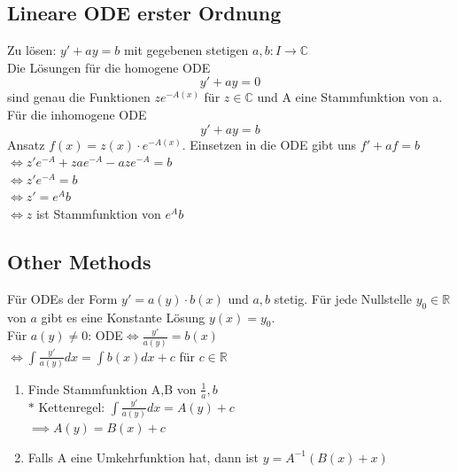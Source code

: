 \subsection{Lineare ODE erster Ordnung}
  Zu lösen: $y'+ay=b$ mit gegebenen stetigen $a,b: I \rightarrow\mathbb C$\\
   Die Lösungen für die homogene ODE $$y'+ay=0$$ sind genau die
  Funktionen $ze^{-A(x)}$ für $z\in\mathbb C$ und A eine Stammfunktion von a.\\
  Für die inhomogene ODE $$y'+ay=b$$ Ansatz $f(x)=z(x)\cdot e^{-A(x)}$.
  Einsetzen in die ODE gibt uns $f'+af=b$\\
  \indent $\iff z'e^{-A}+zae^{-A}-aze^{-A}=b$\\
  \indent $\iff z'e^{-A}=b$\\
  \indent $\iff z'= e^{A}b$\\
  \indent $\iff z$ ist Stammfunktion von $e^{A}b$
\subsection{Other Methods}
  Für ODEs der Form $y'=a(y)\cdot b(x)$ und $a,b$ stetig.
  Für jede Nullstelle $y_0\in\mathbb R$ von $a$ gibt es eine Konstante Lösung
  $y(x)=y_0$.\\
  Für $a(y)\neq0$: ODE$\iff \frac{y'}{a(y)}=b(x)$\\
  $\iff\int \frac{y'}{a(y)}dx=\int b(x)dx+c$ für $c\in\mathbb R$
  \begin{enumerate}
    \item Finde Stammfunktion A,B von $\frac{1}{a}, b$\\
    $*$ Kettenregel: $\int\frac{y'}{a(y)}dx = A(y)+c$\\
    $\implies A(y)=B(x) + c$
    \item Falls A eine Umkehrfunktion hat, dann ist $y=A^{-1}(B(x)+x)$
  \end{enumerate}

